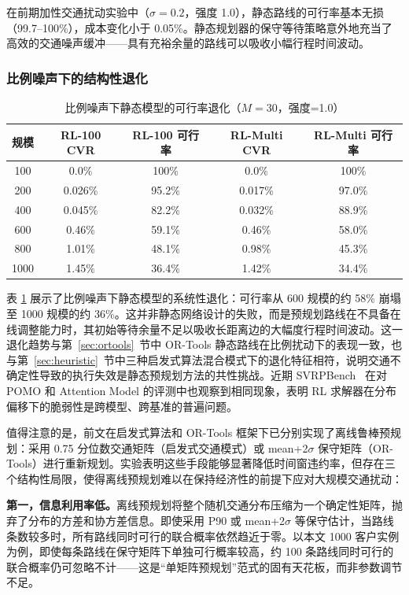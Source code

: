 \documentclass[12pt,a4paper,UTF8]{article}
\begin{document}
在前期加性交通扰动实验中（$\sigma=0.2$，强度 1.0），静态路线的可行率基本无损（99.7--100\%），成本变化小于 0.05\%。静态规划器的保守等待策略意外地充当了高效的交通噪声缓冲——具有充裕余量的路线可以吸收小幅行程时间波动。

\subsubsection{比例噪声下的结构性退化}

\begin{table}[htbp]
	\centering
	\caption{比例噪声下静态模型的可行率退化（$M=30$，强度=1.0）}
	\label{tab:prop_degradation}
	\begin{tabular}{ccccc}
		\toprule
		规模 & RL-100 CVR & RL-100 可行率 & RL-Multi CVR & RL-Multi 可行率 \\
		\midrule
		100  & 0.0\%     & 100\%  & 0.0\%     & 100\%  \\
		200  & 0.026\%   & 95.2\% & 0.017\%   & 97.0\% \\
		400  & 0.045\%   & 82.2\% & 0.032\%   & 88.9\% \\
		600  & 0.46\%    & 59.1\% & 0.46\%    & 58.0\% \\
		800  & 1.01\%    & 48.1\% & 0.98\%    & 45.3\% \\
		1000 & 1.45\%    & 36.4\% & 1.42\%    & 34.4\% \\
		\bottomrule
	\end{tabular}
\end{table}

表 \ref{tab:prop_degradation} 展示了比例噪声下静态模型的系统性退化：可行率从 600 规模的约 58\% 崩塌至 1000 规模的约 36\%。这并非静态网络设计的失败，而是预规划路线在不具备在线调整能力时，其初始等待余量不足以吸收长距离边的大幅度行程时间波动。这一退化趋势与第~\ref{sec:ortools}~节中 OR-Tools 静态路线在比例扰动下的表现一致，也与第~\ref{sec:heuristic}~节中三种启发式算法混合模式下的退化特征相符，说明交通不确定性导致的执行失效是静态预规划方法的共性挑战。近期 SVRPBench~\cite{heakl2025svrpbench} 在对 POMO 和 Attention Model 的评测中也观察到相同现象，表明 RL 求解器在分布偏移下的脆弱性是跨模型、跨基准的普遍问题。

值得注意的是，前文在启发式算法和 OR-Tools 框架下已分别实现了离线鲁棒预规划：采用 0.75 分位数交通矩阵（启发式交通模式）或 mean+2$\sigma$ 保守矩阵（OR-Tools）进行重新规划。实验表明这些手段能够显著降低时间窗违约率，但存在三个结构性局限，使得离线预规划难以在保持经济性的前提下应对大规模交通扰动：

\textbf{第一，信息利用率低。}离线预规划将整个随机交通分布压缩为一个确定性矩阵，抛弃了分布的方差和协方差信息。即使采用 P90 或 mean+2$\sigma$ 等保守估计，当路线条数较多时，所有路线同时可行的联合概率依然趋近于零。以本文 1000 客户实例为例，即使每条路线在保守矩阵下单独可行概率较高，约 100 条路线同时可行的联合概率仍可忽略不计——这是“单矩阵预规划”范式的固有天花板，而非参数调节不足。
\end{document}
